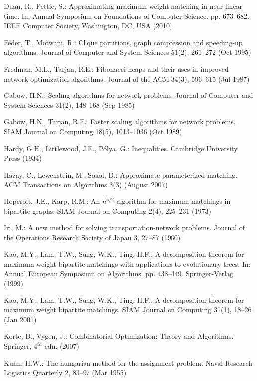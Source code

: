 \documentclass[runningheads,a4paper]{llncs}
\begin{document}
\begin{thebibliography}{10}
Duan, R., Pettie, S.: Approximating maximum weight matching in near-linear
  time. In: Annual Symposium on Foundations of Computer Science. pp. 673--682.
  IEEE Computer Society, Washington, DC, USA (2010)

Feder, T., Motwani, R.: Clique partitions, graph compression and speeding-up
  algorithms. Journal of Computer and System Sciences  51(2),  261--272 (Oct
  1995)

Fredman, M.L., Tarjan, R.E.: Fibonacci heaps and their uses in improved network
  optimization algorithms. Journal of the ACM  34(3),  596--615 (Jul 1987)

Gabow, H.N.: Scaling algorithms for network problems. Journal of Computer and
  System Sciences  31(2),  148--168 (Sep 1985)

Gabow, H.N., Tarjan, R.E.: Faster scaling algorithms for network problems. SIAM
  Journal on Computing  18(5),  1013--1036 (Oct 1989)

Hardy, G.H., Littlewood, J.E., P\'olya, G.: Inequalities. Cambridge University
  Press (1934)

Hazay, C., Lewenstein, M., Sokol, D.: Approximate parameterized matching. ACM
  Transactions on Algorithms  3(3) (August 2007)

Hopcroft, J.E., Karp, R.M.: An $n^{5/2}$ algorithm for maximum matchings in
  bipartite graphs. SIAM Journal on Computing  2(4),  225--231 (1973)

Iri, M.: A new method for solving transportation-network problems. Journal of
  the Operations Research Society of Japan  3,  27--87 (1960)

Kao, M.Y., Lam, T.W., Sung, W.K., Ting, H.F.: A decomposition theorem for
  maximum weight bipartite matchings with applications to evolutionary trees.
  In: Annual European Symposium on Algorithms. pp. 438--449. Springer-Verlag
  (1999)

Kao, M.Y., Lam, T.W., Sung, W.K., Ting, H.F.: A decomposition theorem for
  maximum weight bipartite matchings. SIAM Journal on Computing  31(1),  18--26
  (Jan 2001)

Korte, B., Vygen, J.: Combinatorial Optimization: Theory and Algorithms.
  Springer, $4^{th}$ edn. (2007)

Kuhn, H.W.: The hungarian method for the assignment problem. Naval Research
  Logistics Quarterly  2,  83--97 (Mar 1955)


\end{thebibliography}
\end{document}
